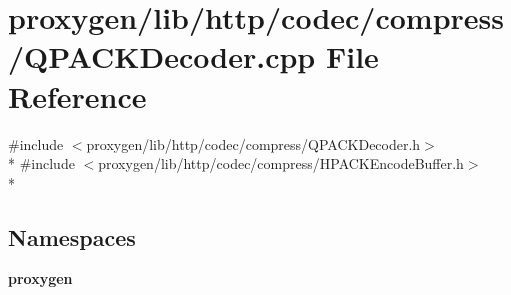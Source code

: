 \section{proxygen/lib/http/codec/compress/\+Q\+P\+A\+C\+K\+Decoder.cpp File Reference}
\label{QPACKDecoder_8cpp}
{\ttfamily \#include $<$proxygen/lib/http/codec/compress/\+Q\+P\+A\+C\+K\+Decoder.\+h$>$}\\*
{\ttfamily \#include $<$proxygen/lib/http/codec/compress/\+H\+P\+A\+C\+K\+Encode\+Buffer.\+h$>$}\\*
\subsection*{Namespaces}
\begin{DoxyCompactItemize}
\item 
 {\bf proxygen}
\end{DoxyCompactItemize}
